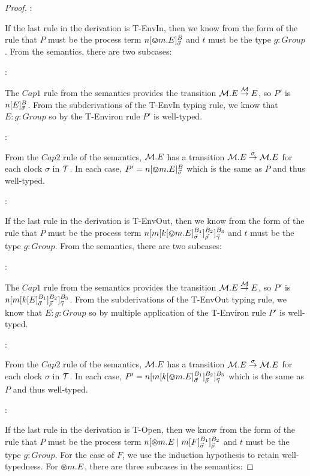 \begin{proof}
:

\noindent If the last rule in the derivation is T-EnvIn, then we know
from the form of the rule that $P$ must be the process term
${n}[ \varovee m.E ]^{B}_{\vec{\sigma}}$ and $t$ must be the type $g :
  Group$.  From the semantics, there are two subcases:

:

\noindent The $Cap1$ rule from the semantics provides the transition
$\text{$\mathcal{M}$}.E \stackrel{\text{$\mathcal{M}$}}{\rightarrow} E$, so $P'$ is
${n}[ E ]^{B}_{\vec{\sigma}}$.  From the subderivations of the
T-EnvIn typing rule, we know that $E : g : Group$ so by the T-Environ
rule $P'$ is well-typed.

:

\noindent From the $Cap2$ rule of the semantics, $\text{$\mathcal{M}$}.E$ has a
transition $\text{$\mathcal{M}$}.E \stackrel{\sigma}{\rightarrow} \text{$\mathcal{M}$}.E$ for each clock
$\sigma$ in $\text{$\mathcal{T}$}$.  In each case, $P' =
{n}[ \varovee m.E ]^{B}_{\vec{\sigma}}$ which is the same as $P$ and
thus well-typed.

:

\noindent If the last rule in the derivation is T-EnvOut, then we know
from the form of the rule that $P$ must be the process term
${n}[ {m}[ {k}[ \varovee m.E ]^{B_1}_{\vec{\sigma}} ]^{B_2}_{\vec{\rho}} ]^{B_3}_{\vec{\gamma}}$
and $t$ must be the type $g : Group$.  From the semantics, there are
two subcases:

:

\noindent The $Cap1$ rule from the semantics provides the transition
$\text{$\mathcal{M}$}.E \stackrel{\text{$\mathcal{M}$}}{\rightarrow} E$, so $P'$ is
${n}[ {m}[ {k}[ E ]^{B_1}_{\vec{\sigma}} ]^{B_2}_{\vec{\rho}} ]^{B_3}_{\vec{\gamma}}$.
From the subderivations of the T-EnvOut typing rule, we know that $E : g
: Group$ so by multiple application of the T-Environ rule $P'$ is
well-typed.

:

\noindent From the $Cap2$ rule of the semantics, $\text{$\mathcal{M}$}.E$ has a
transition $\text{$\mathcal{M}$}.E \stackrel{\sigma}{\rightarrow} \text{$\mathcal{M}$}.E$ for each clock
$\sigma$ in $\text{$\mathcal{T}$}$.  In each case, $P' =
{n}[ {m}[ {k}[ \varovee m.E ]^{B_1}_{\vec{\sigma}} ]^{B_2}_{\vec{\rho}} ]^{B_3}_{\vec{\gamma}}$
which is the same as $P$ and thus well-typed.

:

\noindent If the last rule in the derivation is T-Open, then we know
from the form of the rule that $P$ must be the process term
${n}[ \varoast m.E \;|\;
  {m}[ F ]^{B_1}_{\vec{\sigma}} ]^{B_2}_{\vec{\rho}}$ and $t$ must be
the type $g : Group$.  For the case of $F$, we use the induction
hypothesis to retain well-typedness.  For $\varoast m.E$, there are
three subcases in the semantics:


\end{proof}
